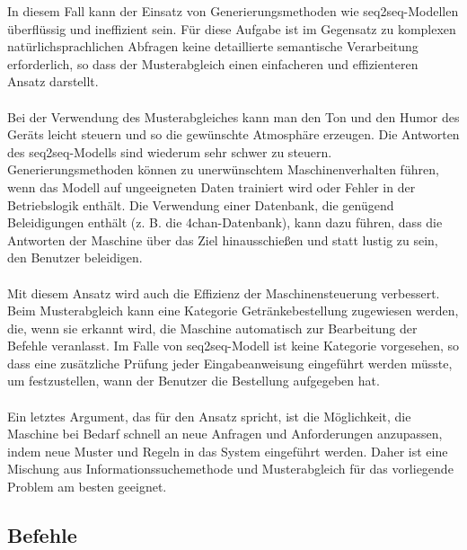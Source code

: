 In diesem Fall kann der Einsatz von Generierungsmethoden wie seq2seq-Modellen überflüssig und ineffizient sein.
Für diese Aufgabe ist im Gegensatz zu komplexen natürlichsprachlichen Abfragen keine detaillierte semantische Verarbeitung erforderlich, so dass der Musterabgleich einen einfacheren und effizienteren Ansatz darstellt.\\\\
Bei der Verwendung des Musterabgleiches kann man den Ton und den Humor des Geräts leicht steuern und so die gewünschte Atmosphäre erzeugen.
Die Antworten des seq2seq-Modells sind wiederum sehr schwer zu steuern.
Generierungsmethoden können zu unerwünschtem Maschinenverhalten führen, wenn das Modell auf ungeeigneten Daten trainiert wird oder Fehler in der Betriebslogik enthält.
Die Verwendung einer Datenbank, die genügend Beleidigungen enthält (z. B. die 4chan-Datenbank), kann dazu führen, dass die Antworten der Maschine über das Ziel hinausschießen und statt lustig zu sein, den Benutzer beleidigen.\\\\
Mit diesem Ansatz wird auch die Effizienz der Maschinensteuerung verbessert.
Beim Musterabgleich kann eine Kategorie \glqq{}Getränkebestellung\grqq{} zugewiesen werden, die, wenn sie erkannt wird, die Maschine automatisch zur Bearbeitung der Befehle veranlasst.
Im Falle von seq2seq-Modell ist keine Kategorie vorgesehen, so dass eine zusätzliche Prüfung jeder Eingabeanweisung eingeführt werden müsste, um festzustellen, wann der Benutzer die Bestellung aufgegeben hat.\\\\
Ein letztes Argument, das für den Ansatz spricht, ist die Möglichkeit, die Maschine bei Bedarf schnell an neue Anfragen und Anforderungen anzupassen, indem neue Muster und Regeln in das System eingeführt werden.
Daher ist eine Mischung aus Informationssuchemethode und Musterabgleich für das vorliegende Problem am besten geeignet.
\subsection{Befehle}
\endinput



